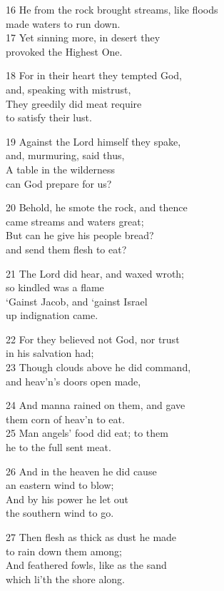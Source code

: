 16 He from the rock brought streams, like floods\\
made waters to run down.\\
17 Yet sinning more, in desert they\\
provoked the Highest One.

18 For in their heart they tempted God,\\
and, speaking with mistrust,\\
They greedily did meat require\\
to satisfy their lust.

19 Against the Lord himself they spake,\\
and, murmuring, said thus,\\
A table in the wilderness\\
can God prepare for us?

20 Behold, he smote the rock, and thence\\
came streams and waters great;\\
But can he give his people bread?\\
and send them flesh to eat?

21 The Lord did hear, and waxed wroth;\\
so kindled was a flame\\
‘Gainst Jacob, and ‘gainst Israel\\
up indignation came.

22 For they believed not God, nor trust\\
in his salvation had;\\
23 Though clouds above he did command,\\
and heav’n’s doors open made,

24 And manna rained on them, and gave\\
them corn of heav’n to eat.\\
25 Man angels’ food did eat; to them\\
he to the full sent meat.

26 And in the heaven he did cause\\
an eastern wind to blow;\\
And by his power he let out\\
the southern wind to go.

27 Then flesh as thick as dust he made\\
to rain down them among;\\
And feathered fowls, like as the sand\\
which li’th the shore along.

